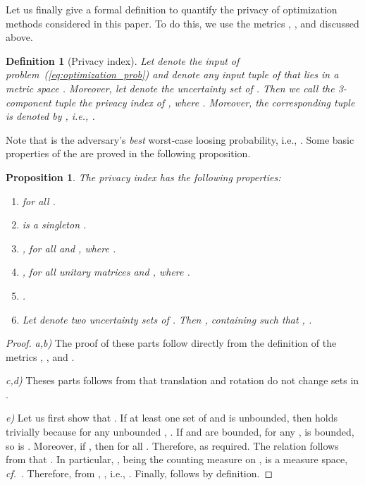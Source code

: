 \documentclass[12pt,draftcls,onecolumn]{IEEEtran}
\newtheorem{defin}{Definition}\newtheorem{assump}{Assumption}
\newtheorem{prop}{Proposition}
\newcommand{\cf}{{\textit{cf.}}}
\newcommand{\addnew}[1]{{{\color{blue!0!black}#1}}}
\begin{document}
\addnew{
Let us finally give a formal definition to quantify the privacy of optimization methods considered in this paper. To do this, we use the metrics , , and  discussed above.}
\addnew{
\begin{defin}[Privacy index]\label{def:input_privacy}
Let  denote the input of problem~(\ref{eq:optimization_prob}) and  denote any input tuple of  that lies in a metric space . Moreover, let  denote the uncertainty set of . Then we call the 3-component tuple  the privacy index of , where . Moreover, the corresponding tuple is denoted by , i.e., . \hfill 
\end{defin}
}
\addnew
{
\noindent Note that  is the adversary's \emph{best} worst-case loosing probability, i.e., . Some basic properties of the  are proved in the following proposition.
\begin{prop}\label{prop:privacy_index}
The privacy index  has the following properties:
\begin{enumerate}
\item[a)]  for all .
\item[b)]  is a singleton  .
\item[c)] , for all  and , where .
\item[d)] , for all unitary matrices  and , where .
\item[e)] .
\item[f)] Let  denote two uncertainty sets of . Then   , containing  such that , . \hfill 
\end{enumerate}

\end{prop}
\begin{proof}


\textit{a,b)} The proof of these parts follow directly from the definition of the metrics , , and .

\textit{c,d)} Theses parts follows from that translation and rotation do not change sets in .

\textit{e)} Let us first show that . If at least one set of  and  is unbounded, then  holds trivially because for any unbounded , . If  and  are bounded, for any ,  is bounded, so is . Moreover, if , then  for all . Therefore,  as required. The relation  follows from that . In particular, ,  being the counting measure on , is a measure space, \cf~\cite[p.~146]{McDonald-Weiss-2013}. Therefore, from \cite[Theorem~5.1]{McDonald-Weiss-2013}, , i.e., . Finally,  follows by definition.


\end{proof}}
\end{document}
